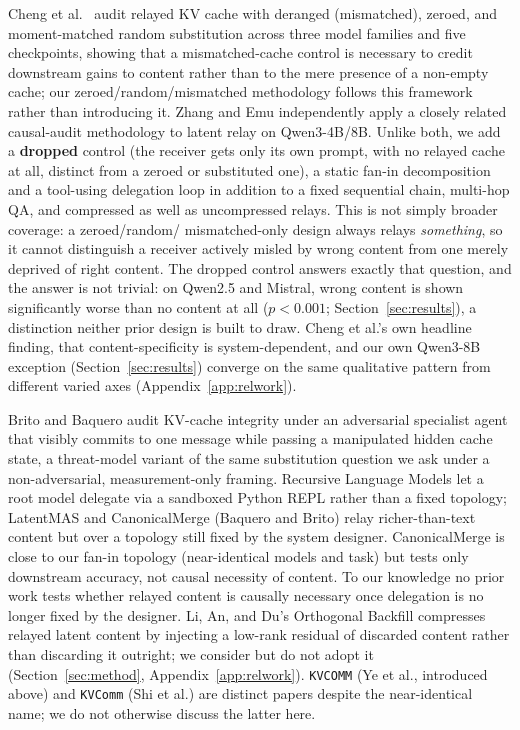 \documentclass[11pt]{article}
\begin{document}
Cheng et al.\ \citep{latentcommpay2026} audit relayed KV cache with
deranged (mismatched), zeroed, and moment-matched random substitution
across three model families and five checkpoints, showing that a
mismatched-cache control is necessary to credit downstream gains to
content rather than to the mere presence of a non-empty cache; our
zeroed/random/mismatched methodology follows this framework rather than
introducing it. Zhang and Emu \citep{zhangemu2026} independently apply a
closely related causal-audit methodology to latent relay on
Qwen3-4B/8B. Unlike both, we add a \textbf{dropped} control (the
receiver gets only its own prompt, with no relayed cache at all,
distinct from a zeroed or substituted one), a static fan-in
decomposition and a tool-using delegation loop in addition to a fixed
sequential chain, multi-hop QA, and compressed as well as uncompressed
relays. This is not simply broader coverage: a zeroed/random/
mismatched-only design always
relays \emph{something}, so it cannot distinguish a receiver actively
misled by wrong content from one merely deprived of right content. The
dropped control answers exactly that question, and the answer is not
trivial: on Qwen2.5 and Mistral, wrong content is shown significantly
worse than no content at all ($p<0.001$; Section~\ref{sec:results}), a
distinction neither prior design is built to draw. Cheng et al.'s own
headline finding, that content-specificity is system-dependent, and our
own Qwen3-8B exception (Section~\ref{sec:results}) converge on the same
qualitative pattern from different varied axes
(Appendix~\ref{app:relwork}).

Brito and Baquero \citep{latentagentslie2026} audit KV-cache integrity
under an adversarial specialist agent that visibly commits to one
message while passing a manipulated hidden cache state, a threat-model
variant of the same substitution question we ask under a
non-adversarial, measurement-only framing. Recursive Language Models
\citep{rlm2026} let a root model delegate via a sandboxed Python REPL
rather than a fixed topology; LatentMAS \citep{latentmas2026} and
CanonicalMerge \citep{canonicalmerge2026} (Baquero and Brito) relay
richer-than-text content but over a topology still fixed by the system
designer. CanonicalMerge is close to our fan-in topology (near-identical
models and task) but tests only downstream accuracy, not causal
necessity of content. To our knowledge no prior work tests whether
relayed content is causally necessary once delegation is no longer
fixed by the designer. Li, An, and Du's Orthogonal Backfill
\citep{orthobackfill2026} compresses relayed latent content by
injecting a low-rank residual of discarded content rather than
discarding it outright; we consider but do not adopt it
(Section~\ref{sec:method}, Appendix~\ref{app:relwork}). \texttt{KVCOMM}
\citep{kvcomm2025} (Ye et al., introduced above) and \texttt{KVComm}
\citep{shikvcomm2025} (Shi et al.) are distinct papers despite the
near-identical name; we do not otherwise discuss the latter here.
\end{document}
